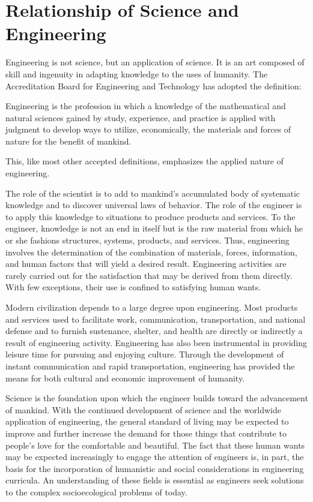 \section{Relationship of Science and Engineering}

Engineering is not science, but an application of science. It is an art composed of skill and ingenuity in adapting knowledge to the uses of humanity. The Accreditation Board for Engineering and Technology has adopted the definition:

Engineering is the profession in which a knowledge of the mathematical and natural sciences gained by study, experience, and practice is applied with judgment to develop ways to utilize, economically, the materials and forces of nature for the benefit of mankind.

This, like most other accepted definitions, emphasizes the applied nature of engineering.

The role of the scientist is to add to mankind’s accumulated body of systematic knowledge and to discover universal laws of behavior. The role of the engineer is to apply this knowledge to situations to produce products and services. To the engineer, knowledge is not an end in itself but is the raw material from which he or she fashions structures, systems, products, and services. Thus, engineering involves the determination of the combination of materials, forces, information, and human factors that will yield a desired result. Engineering activities are rarely carried out for the satisfaction that may be derived from them directly. With few exceptions, their use is confined to satisfying human wants.

Modern civilization depends to a large degree upon engineering. Most products and services used to facilitate work, communication, transportation, and national defense and to furnish sustenance, shelter, and health are directly or indirectly a result of engineering activity. Engineering has also been instrumental in providing leisure time for pursuing and enjoying culture. Through the development of instant communication and rapid transportation, engineering has provided the means for both cultural and economic improvement of humanity.

Science is the foundation upon which the engineer builds toward the advancement of mankind. With the continued development of science and the worldwide application of engineering, the general standard of living may be expected to improve and further increase the demand for those things that contribute to people’s love for the comfortable and beautiful. The fact that these human wants may be expected increasingly to engage the attention of engineers is, in part, the basis for the incorporation of humanistic and social considerations in engineering curricula. An understanding of these fields is essential as engineers seek solutions to the complex socioecological problems of today.

